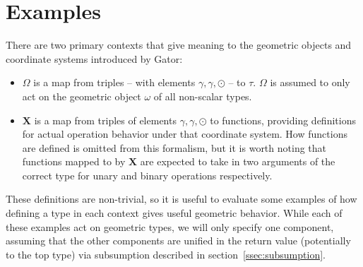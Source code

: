 \documentclass{article}
\newcommand{\Chi}{\mathbf{X}}
\begin{document}
\section{Examples}
There are two primary contexts that give meaning to the geometric objects and coordinate systems introduced by Gator:
\begin{itemize}
	\item $\Omega$ is a map from triples -- with elements $\gamma,\gamma,\odot$ -- to $\tau$.  $\Omega$ is assumed to only act on the geometric object $\omega$ of all non-scalar types.
	
	\item $\Chi$ is a map from triples of elements $\gamma, \gamma,\odot$ to functions, providing definitions for actual operation behavior under that coordinate system.
	How functions are defined is omitted from this formalism, but it is worth noting that functions mapped to by $\Chi$ are expected to take in two arguments of the correct type for unary and binary operations respectively.
\end{itemize}
These definitions are non-trivial, so it is useful to evaluate some examples of how defining a type in each context gives useful geometric behavior.  While each of these examples act on geometric types, we will only specify one component, assuming that the other components are unified in the return value (potentially to the top type) via subsumption described in section~\ref{ssec:subsumption}.
\end{document}
